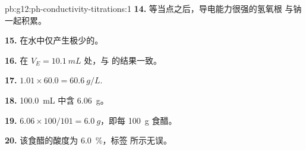 \begin{solution}{pb:g12:ph-conductivity-titrations:1}
\textbf{14.} 等当点之后，导电能力很强的氢氧根
与钠一起积累。

\textbf{15.} 在水中仅产生极少的。

\textbf{16.} 在 $V_E = \qty{10.1}{mL}$ 处，与  的结果一致。

\textbf{17.} $1.01 \times 60.0 = \qty{60.6}{g/L}$.

\textbf{18.} \qty{100.0}{mL} 中含 \qty{6.06}{g}。

\textbf{19.} $6.06 \times 100 / 101 = \qty{6.0}{g}$，即每 \qty{100}{g} 食醋。

\textbf{20.} 该食醋的酸度为 \qty{6.0}{\percent}，标签
所示无误。
\end{solution}
